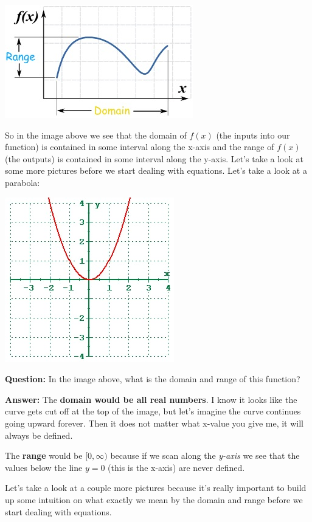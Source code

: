 \documentclass[12pt]{article}
\begin{document}
\centerline{\includegraphics{DomainAndRangePlot.jpg}}

So in the image above we see that the domain of $f(x)$ (the inputs into our function) is contained in some interval along the x-axis and the range of $f(x)$ (the outputs) is contained in some interval along the y-axis. 
\newpage
Let's take a look at some more pictures before we start dealing with equations. Let's take a look at a parabola:
\newline

\centerline{\includegraphics{Quadratic.jpg}}

\textbf{Question:} In the image above, what is the domain and range of this function?

\textbf{Answer:} The \textbf{domain would be all real numbers}. I know it looks like the curve gets cut off at the top of the image, but let's imagine the curve continues going upward forever. Then it does not matter what x-value you give me, it will always be defined.

The \textbf{range} would be $[0, \infty)$ because if we scan along the \textit{y-axis} we see that the values below the line $y = 0$ (this is the x-axis) are never defined.

Let's take a look at a couple more pictures because it's really important to build up some intuition on what exactly we mean by the domain and range before we start dealing with equations.
\end{document}

